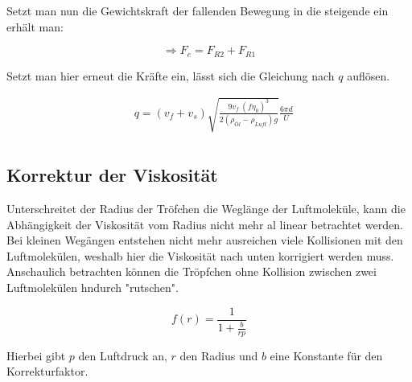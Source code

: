 Setzt man nun die Gewichtskraft der fallenden Bewegung in die steigende ein erhält man:

\begin{equation}
    \Rightarrow F_e = F_{R2} + F_{R1}
\end{equation}

Setzt man hier erneut die Kräfte ein, lässt sich die Gleichung nach $q$ auflösen.

\begin{align}
    &q = (v_f + v_s)\sqrt{\frac{9 v_f\ (f\eta_0)^3}{2 (\rho_{Öl}- \rho_{Luft}) g}}\frac{6 \pi d}{U} \\ \label{eq:q}
\end{align}

\subsection{Korrektur der Viskosität}

Unterschreitet der Radius der Tröfchen die Weglänge der Luftmoleküle, kann die Abhängigkeit der Viskosität vom Radius nicht mehr al linear betrachtet werden.
Bei kleinen Wegängen entstehen nicht mehr ausreichen viele Kollisionen mit den Luftmolekülen, weshalb hier die Viskosität nach unten korrigiert werden muss.
Anschaulich betrachten können die Tröpfchen ohne Kollision zwischen zwei Luftmolekülen hndurch "rutschen".

\begin{equation}
    f(r) = \frac{1}{1+\tfrac{b}{rp}}
\end{equation}

Hierbei gibt $p$ den Luftdruck an, $r$ den Radius und $b$ eine Konstante für den Korrekturfaktor.